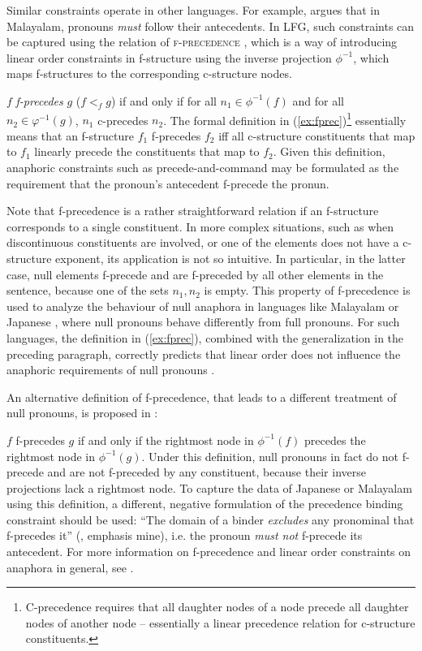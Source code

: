 \documentclass[output=paper,hidelinks]{langscibook}
\begin{document}
 Similar constraints operate in other languages. For example, \textcite{mohanan1982} argues that in Malayalam, pronouns \textit{must} follow their antecedents. In LFG, such constraints can be captured using the relation of \textsc{f-precedence} \parencite{kaplan-zaenen1989-fprec}, which is a way of introducing linear order constraints in f-structure using the inverse projection $\phi^{-1}$, which maps f-structures to the corresponding c-structure nodes.
 
 \ea\label{ex:fprec}
  $f$ \textit{f-precedes} $g$ ($f <_f g$) if and only if for all $n_1 \in \phi^{-1}(f)$ and for all $n_2 \in φ^{-1}(g)$, $n_1$ c-precedes $n_2$.
 \z
The formal definition in (\ref{ex:fprec})\footnote{C-precedence requires that all daughter nodes of a node precede all daughter nodes of another node -- essentially a linear precedence relation for c-structure constituents.} essentially means that an f-structure $f_1$ f-precedes $f_2$ iff all c-structure constituents that map to $f_1$ linearly precede the constituents that map to $f_2$. Given this definition, anaphoric constraints such as precede-and-command may be formulated as the requirement that the pronoun's antecedent f-precede the pronun.
 
 Note that f-precedence is a rather straightforward relation if an f-structure corresponds to a single constituent. In more complex situations, such as when discontinuous constituents are involved, or one of the elements does not have a c-structure exponent, its application is not so intuitive. In particular, in the latter case, null elements f-precede and are f-preceded by all other elements in the sentence, because one of the sets $n_1, n_2$ is empty. This property of f-precedence is used to analyze the behaviour of null anaphora in languages like Malayalam \parencite{mohanan1982} or Japanese \parencite{kameyama85}, where null pronouns behave differently from full pronouns. For such languages, the definition in (\ref{ex:fprec}), combined with the generalization in the preceding paragraph, correctly predicts that linear order does not influence the anaphoric requirements of null pronouns \parencite[257]{DLM:LFG}.
 
 An alternative definition of f-precedence, that leads to a different treatment of null pronouns, is proposed in \textcite[213]{BresnanEtAl2016}:
 
 \ea
 $f$ f-precedes $g$ if and only if the rightmost node in $\phi^{-1}(f)$ precedes the rightmost node in $\phi^{-1}(g)$.
 \z
Under this definition, null pronouns in fact do not f-precede and are not f-prece\-ded by any constituent, because their inverse projections lack a rightmost node. To capture the data of Japanese or Malayalam using this definition, a different, negative formulation of the precedence binding constraint should be used: ``The domain of a binder \textit{excludes} any pronominal that f-precedes it'' (\cite[213]{BresnanEtAl2016}, emphasis mine), i.e. the pronoun \textit{must not} f-precede its antecedent. For more information on f-precedence and linear order constraints on anaphora in general, see .
 
\end{document}
